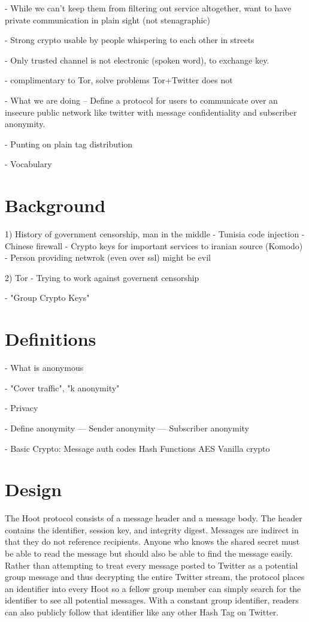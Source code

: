 \documentclass{acm_proc_article-sp}
\begin{document}
- While we can't keep them from filtering out service altogether, want to have private communication in plain sight (not stenagraphic)

- Strong crypto usable by people whispering to each other in streets

- Only trusted channel is not electronic (spoken word), to exchange key.


- complimentary to Tor, solve problems Tor+Twitter does not

- What we are doing
-- Define a protocol for users to communicate over an insecure public network like twitter with message confidentiality and subscriber anonymity. 

- Punting on plain tag distribution

- Vocabulary

\section{Background}

1) History of government censorship, man in the middle
	- Tunisia code injection
	- Chinese firewall
	- Crypto keys for important services to iranian source (Komodo)
	- Person providing netwrok (even over ssl) might be evil

2) Tor
	- Trying to work against governent censorship
	
- "Group Crypto Keys"
	
\section{Definitions}

- What is anonymous

- "Cover traffic", "k anonymity"

- Privacy

- Define anonymity
--- Sender anonymity
--- Subscriber anonymity

- Basic Crypto:
	Message auth codes
	Hash Functions
	AES
	Vanilla crypto

\section{Design}

The Hoot protocol consists of a message header and a message body. The header contains the identifier, session key, and integrity digest. Messages are indirect in that they do not reference recipients. Anyone who knows the shared secret must be able to read the message but should also be able to find the message easily. Rather than attempting to treat every message posted to Twitter as a potential group message and thus decrypting the entire Twitter stream, the protocol places an identifier into every Hoot so a fellow group member can simply search for the identifier to see all potential messages. With a constant group identifier, readers can also publicly follow that identifier like any other Hash Tag on Twitter.
\end{document}

